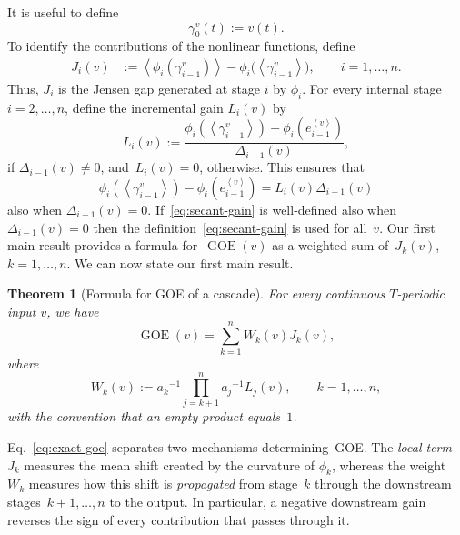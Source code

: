 \documentclass[onecolumn]{IEEEtran}
\newcommand{\GOE}{\operatorname{GOE}}
\newcommand{\avg}[1]{\left\langle #1\right\rangle}
\newtheorem{theorem}{Theorem}
\begin{document}
It is useful to define
\begin{equation}\label{eq:gamm0}
\gamma_0^v(t) := v(t).
\end{equation}
To identify the     contributions of the nonlinear functions, define
\begin{align}  \label{eq:jensen-internal}
    J_i(v)
    &:=
    \avg{\phi_i(\gamma_{i-1}^v)}
    -
    \phi_i\bigl(\avg{\gamma_{i-1}^v}\bigr),
    \qquad i=1,\ldots,n.
\end{align}
Thus, $J_i$ is the Jensen gap generated at stage $i$ by $\phi_i$.
For every internal stage $i=2,\ldots,n$, define the incremental
gain $  L_i(v)$ by
\begin{equation}\label{eq:secant-gain} 
    L_i(v)
    :=
    \dfrac{
    \phi_i(\avg{\gamma_{i-1}^v})
    -
    \phi_i(e_{i-1}^{\avg {v}})
    }{
    \Delta_{i-1}(v)
    },
\end{equation} 
if 
$ \Delta_{i-1}(v)\neq0$,
and~$L_i(v)=0$, otherwise.
This   ensures that
\begin{equation}\label{eq:ensuresthat}
    \phi_i(\avg{\gamma_{i-1}^v})
    -
    \phi_i(e_{i-1}^{\avg {v}})
    =
    L_i(v)\Delta_{i-1}(v)
\end{equation}
also when $\Delta_{i-1}(v)=0$.
If~\eqref{eq:secant-gain} is well-defined also when~$\Delta_{i-1}(v)=0$ then   the definition~\eqref{eq:secant-gain} is used for all~$v$. 
 Our first main result provides a formula for~$\GOE(v)$ 
as a weighted sum of~$J_k(v)$, $k=1,\dots,n$.
We can now state our first main result. 
\begin{theorem}[Formula for GOE of  a cascade]
\label{thm:exact-decomp}
For every continuous $T$-periodic input $v$, we have 
\begin{equation}  \label{eq:exact-goe}
     \GOE(v)
    =
    \sum_{k=1}^n W_k(v)J_k(v)
    ,
\end{equation}
where
\begin{equation}
    W_k(v)
    :=
    {a_k} ^{-1}
    \prod_{j=k+1}^n
 {a_j}  ^{-1} {L_j(v)} ,
    \qquad k=1,\ldots,n, 
    \label{eq:cascade-weight}
\end{equation}
with the convention that an empty product equals~$1$.
\end{theorem}

Eq.~\eqref{eq:exact-goe} separates two mechanisms determining~GOE. The \emph{local term}
$J_k$ measures the mean shift  created  by the curvature of $\phi_k$,
whereas the weight~$W_k$ measures how this shift is \emph{propagated} from stage~$k$
through the downstream stages~$k+1,\ldots,n$ to the output. In particular,
a negative downstream   gain reverses the sign of every contribution
that passes through it. 
 
\end{document}
